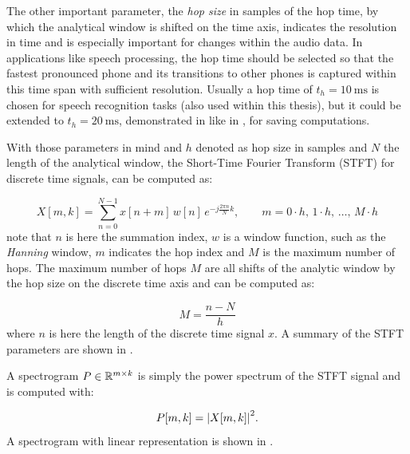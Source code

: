 The other important parameter, the \emph{hop size} in samples of the hop time, by which the analytical window is shifted on the time axis, indicates the resolution in time and is especially important for changes within the audio data.
In applications like speech processing, the hop time should be selected so that the fastest pronounced phone and its transitions to other phones is captured within this time span with sufficient resolution.
Usually a hop time of $t_{h}=\SI{10}{\milli\second}$ is chosen for speech recognition tasks (also used within this thesis), but it could be extended to $t_{h}=\SI{20}{\milli\second}$, demonstrated in like in \cite{Peter2020}, for saving computations.

With those parameters in mind and $h$ denoted as hop size in samples and $N$ the length of the analytical window, the Short-Time Fourier Transform (STFT) for discrete time signals, can be computed as:

\begin{equation}\label{eq:signal_spec_stft}
    X[m, k] = \sum_{n=0}^{N-1} x[n + m] \, w[n] \, e^{-j\frac{2 \pi n}{N}k}, \qquad m = 0 \cdot h, \, 1 \cdot h, \, \dots, \, M \cdot h 
\end{equation}
note that $n$ is here the summation index, $w$ is a window function, such as the \emph{Hanning} window, $m$ indicates the hop index and $M$ is the maximum number of hops.
The maximum number of hops $M$ are all shifts of the analytic window by the hop size on the discrete time axis and can be computed as:

\begin{equation}\label{eq:signal_spec_hop}
  M = \frac{n-N}{h}
\end{equation}
where $n$ is here the length of the discrete time signal $x$.
A summary of the STFT parameters are shown in .



A spectrogram $P \in \mathbb{R}^{m \times k}$ is simply the power spectrum of the STFT signal and is computed with:

\begin{equation}\label{eq:signal_spec_spec}
  P[m, k] = \abs{X[m, k]}^2.
\end{equation}
A spectrogram with linear representation is shown in .

